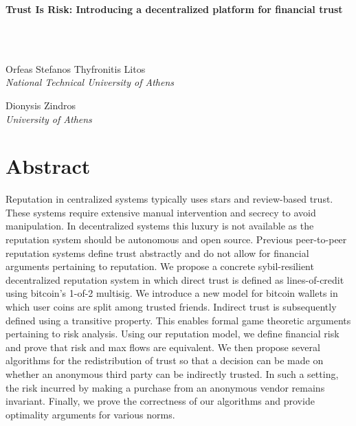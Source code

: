 \documentclass[11pt]{article}
\theoremstyle{definition}
\theoremstyle{corollary}
\theoremstyle{lemma}
\begin{document}
  \begin{centering}
     \Large{\textbf{Trust Is Risk: Introducing a decentralized platform for financial trust}}
  \end{centering}
  \ \\ \ \\
  \hspace*{\fill}
  \begin{minipage}[t]{7cm}
     \begin{flushleft}
        Orfeas Stefanos Thyfronitis Litos \\
        \textit{National Technical University of Athens}
     \end{flushleft}
  \end{minipage}
  \hfill
  \begin{minipage}[t]{7cm}
     \begin{flushright}
        Dionysis Zindros \\
        \textit{University of Athens}
     \end{flushright}
  \end{minipage}
  \hspace*{\fill}

  \section{Abstract}
  Reputation in centralized systems typically uses stars and review-based
  trust. These systems require extensive manual intervention and secrecy to
  avoid manipulation. In decentralized systems this luxury is not available
  as the reputation system should be autonomous and open source. Previous
  peer-to-peer reputation systems define trust abstractly and do not allow for
  financial arguments pertaining to reputation. We propose a concrete
  sybil-resilient decentralized reputation system in which direct trust is
  defined as lines-of-credit using bitcoin's 1-of-2 multisig. We introduce a new
  model for bitcoin wallets in which user coins are split among trusted friends.
  Indirect trust is subsequently defined using a transitive property. This
  enables formal game theoretic arguments pertaining to risk analysis. Using our
  reputation model, we define financial risk and prove that risk and max flows
  are equivalent. We then propose several algorithms for the redistribution of
  trust so that a decision can be made on whether an anonymous third party can
  be indirectly trusted. In such a setting, the risk incurred by making a
  purchase from an anonymous vendor remains invariant. Finally, we prove the
  correctness of our algorithms and provide optimality arguments for various
  norms.
\end{document}
